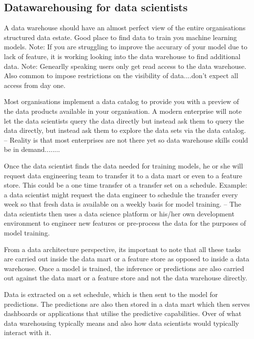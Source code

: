 \documentclass[11pt]{article}
\begin{document}
    \subsection{Datawarehousing for data scientists}

    A data warehouse should have an almost perfect view of the entire organisations structured data estate.
    Good place to find data to train you machine learning models.
    Note: If you are struggling to improve the accurary of your model due to lack of feature, it is working looking into the data warehouse to find additional data.
    Note: Genearlly speaking users only get read access to the data warehouse.
    Also common to impose restrictions on the visibility of data....don't expect all access from day one.

    Most organisations implement a data catalog to provide you with a preview of the data products available in your organisation.
    A modern enterprise will note let the data scientists query the data directly but instead ask them to query the data directly, but instead ask them to explore the data sets via the data catalog.
    -- Reality is that most enterprises are not there yet so data warehouse skills could be in demand........

    Once the data scientist finds the data needed for training models, he or she will request data engineering team to transfer it to a data mart or even to a feature store.
    This could be a one time transfer ot a transfer set on a schedule.
    Example: a data scientist might request the data engineer to schedule the transfer every week so that fresh data is available on a weekly basis for model training.
    -- The data scientists then uses a data science platform or his/her own development environment to engineer new features or pre-process the data for the purposes of model training.

    From a data architecture perspective, its important to note that all these tasks are carried out inside the data mart or a feature store as opposed to inside a data warehouse.
    Once a model is trained, the inference or predictions are also carried out against the data mart or a feature store and not the data warehouse directly.

    Data is extracted on a set schedule, which is then sent to the model for predictions.
    The predictions are also then stored in a data mart which then serves dashboards or applications that utilise the predictive capabilities.
    Over of what data warehousing typically means and also how data scientists would typically interact with it.
\end{document}
